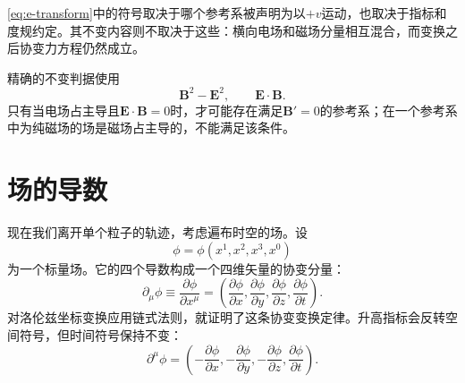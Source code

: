 \eqref{eq:e-transform}中的符号取决于哪个参考系被声明为以\(+v\)运动，也取决于指标和度规约定。其不变内容则不取决于这些：横向电场和磁场分量相互混合，而变换之后协变力方程仍然成立。

\begin{classroomqa}
\end{classroomqa}

精确的不变判据使用
\begin{equation}
  \boldsymbol B^2-\boldsymbol E^2,
  \qquad
  \boldsymbol E\cdot\boldsymbol B.
\end{equation}
只有当电场占主导且\(\boldsymbol E\cdot\boldsymbol B=0\)时，才可能存在满足\(\boldsymbol B'=0\)的参考系；在一个参考系中为纯磁场的场是磁场占主导的，不能满足该条件。

\begin{classroomqa}
\end{classroomqa}

\section{场的导数}

现在我们离开单个粒子的轨迹，考虑遍布时空的场。设
\begin{equation}
  \phi=\phi(x^1,x^2,x^3,x^0)
\end{equation}
为一个标量场。它的四个导数构成一个四维矢量的协变分量：
\begin{equation}
  \partial_\mu\phi
  \equiv\frac{\partial\phi}{\partial x^\mu}
  =\left(
    \frac{\partial\phi}{\partial x},
    \frac{\partial\phi}{\partial y},
    \frac{\partial\phi}{\partial z},
    \frac{\partial\phi}{\partial t}
  \right).
\end{equation}
对洛伦兹坐标变换应用链式法则，就证明了这条协变变换定律。升高指标会反转空间符号，但时间符号保持不变：
\begin{equation}
  \partial^\mu\phi
  =\left(
    -\frac{\partial\phi}{\partial x},
    -\frac{\partial\phi}{\partial y},
    -\frac{\partial\phi}{\partial z},
    \frac{\partial\phi}{\partial t}
  \right).
\end{equation}

